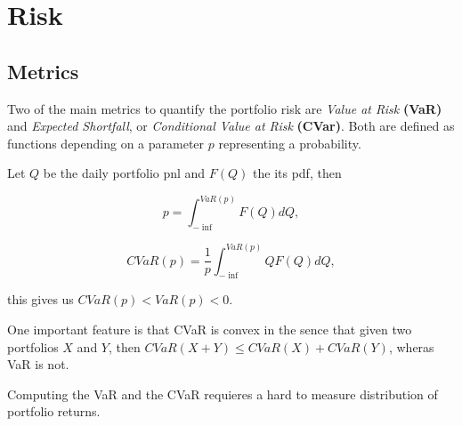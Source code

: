 \section{Risk}

\subsection{Metrics}

Two of the main metrics to quantify the portfolio risk are \textit{Value at Risk} \textbf{(VaR)}
and \textit{Expected Shortfall}, or \textit{Conditional Value at Risk} \textbf{(CVar)}.
Both are defined as functions depending on a parameter $p$ representing a probability.

Let $Q$ be the daily portfolio pnl and $F(Q)$ the its pdf, then

\begin{equation}
	p = \int_{-\inf}^{VaR(p)} F(Q) dQ,
\end{equation}

\begin{equation}
	CVaR(p) = \frac{1}{p} \int_{-\inf}^{VaR(p)} Q F(Q) dQ,
\end{equation}

this gives us $CVaR(p) < VaR(p) < 0$.

One important feature is that CVaR is convex in the sence that given two portfolios $X$ and $Y$,
then $CVaR(X + Y) \leq CVaR(X) + CVaR(Y)$, wheras VaR is not.

Computing the VaR and the CVaR requieres a hard to measure distribution of portfolio returns.
